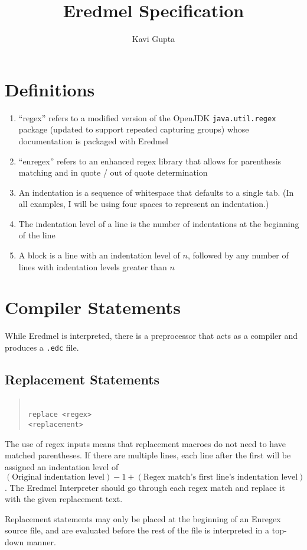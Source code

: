 \documentclass{article}
\newcommand{\code}[1]{\texttt{#1}}
\newcommand{\codeblock}[1]{\begin{quote}\code{\\\noindent #1}\end{quote}}
\newcommand{\indt}{\hspace*{2em}}
\begin{document}
\title{Eredmel Specification}
\author{Kavi Gupta}
\maketitle

\section{Definitions}

\begin{enumerate}
\item ``regex'' refers to a modified version of the OpenJDK \code{java.util.regex} package (updated to support repeated capturing groups) whose documentation is packaged with Eredmel
\item ``enregex'' refers to an enhanced regex library that allows for parenthesis matching and in quote / out of quote determination
\item An indentation is a sequence of whitespace that defaults to a single tab. (In all examples, I will be using four spaces to represent an indentation.)
\item The indentation level of a line is the number of indentations at the beginning of the line 
\item A block is a line with an indentation level of $n$, followed by any number of lines with indentation levels greater than $n$
\end{enumerate}

\section{Compiler Statements}
While Eredmel is interpreted, there is a preprocessor that acts as a compiler and produces a \code{.edc} file.
\subsection{Replacement Statements}
\codeblock{
replace <regex>\\
\indt<replacement>}
The use of regex inputs means that replacement macroes do not need to have matched parentheses. If there are multiple lines, each line after the first will be assigned an indentation level of $(\mbox{Original indentation level}) - 1 + (\mbox{Regex match's first line's indentation level})$. The Eredmel Interpreter should go through each regex match and replace it with the given replacement text.

Replacement statements may only be placed at the beginning of an Enregex source file, and are evaluated before the rest of the file is interpreted in a top-down manner.
\end{document}

